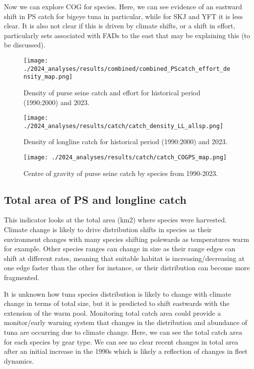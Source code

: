 \documentclass[
]{article}
\begin{document}
Now we can explore COG for species. Here, we can see evidence of an
eastward shift in PS catch for bigeye tuna in particular, while for SKJ
and YFT it is less clear. It is also not clear if this is driven by
climate shifts, or a shift in effort, particularly sets associated with
FADs to the east that may be explaining this (to be discussed).

\begin{figure}
\centering
\texttt{[image: ./2024\_analyses/results/combined/combined\_PScatch\_effort\_density\_map.png]}
\caption{Density of purse seine catch and effort for historical period
(1990:2000) and 2023.}
\end{figure}

\begin{figure}
\centering
\texttt{[image: ./2024\_analyses/results/catch/catch\_density\_LL\_allsp.png]}
\caption{Density of longline catch for historical period (1990:2000) and
2023.}
\end{figure}

\begin{figure}
\centering
\texttt{[image: ./2024\_analyses/results/catch/catch\_COGPS\_map.png]}
\caption{Centre of gravity of purse seine catch by species from
1990-2023.}
\end{figure}

\clearpage

\hypertarget{total-area-of-ps-and-longline-catch}{%
\subsection{Total area of PS and longline
catch}\label{total-area-of-ps-and-longline-catch}}

This indicator looks at the total area (km2) where species were
harvested. Climate change is likely to drive distribution shifts in
species as their environment changes with many species shifting
polewards as temperatures warm for example. Other species ranges can
change in size as their range edges can shift at different rates,
meaning that suitable habitat is increasing/decreasing at one edge
faster than the other for instance, or their distribution can become
more fragmented.

It is unknown how tuna species distribution is likely to change with
climate change in terms of total size, but it is predicted to shift
eastwards with the extension of the warm pool. Monitoring total catch
area could provide a monitor/early warning system that changes in the
distribution and abundance of tuna are occurring due to climate change.
Here, we can see the total catch area for each species by gear type. We
can see no clear recent changes in total area after an initial increase
in the 1990s which is likely a reflection of changes in fleet dynamics.
\end{document}
